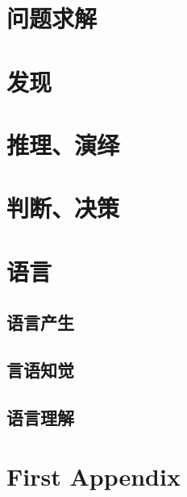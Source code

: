 \documentclass[a4paper,12pt]{article}
\begin{document}
\section{问题求解}

\section{发现}

\section{推理、演绎}

\section{判断、决策}

\section{语言}

\subsection{语言产生}

\subsection{言语知觉}

\subsection{语言理解}

\appendix
\section{First Appendix}
\end{document}
